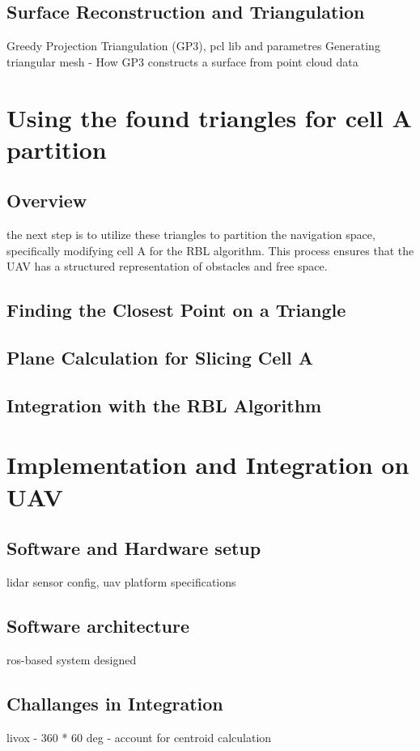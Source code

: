         \subsection{Surface Reconstruction and Triangulation}
            Greedy Projection Triangulation (GP3), pcl lib and parametres
            Generating triangular mesh - How GP3 constructs a surface from point cloud data
    
    \section{Using the found triangles for cell A partition}
        \subsection{Overview}
        the next step is to utilize these triangles to partition the navigation space, specifically modifying cell 
        A for the RBL algorithm. This process ensures that the UAV has a structured representation of obstacles and free space.
        \subsection{Finding the Closest Point on a Triangle}
        \subsection{Plane Calculation for Slicing Cell A}
        \subsection{Integration with the RBL Algorithm}

    \section{Implementation and Integration on UAV}
        \subsection{Software and Hardware setup}
            lidar sensor config, uav platform specifications
        \subsection{Software architecture}
            ros-based system designed
        \subsection{Challanges in Integration}
            livox - 360 * 60 deg - account for centroid calculation
    
